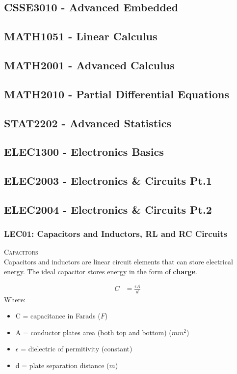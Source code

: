 \subsection{CSSE3010 - Advanced Embedded}
\clearpage

\subsection{MATH1051 - Linear Calculus}
\clearpage

\subsection{MATH2001 - Advanced Calculus}
\clearpage

\subsection{MATH2010 - Partial Differential Equations}
\clearpage

\subsection{STAT2202 - Advanced Statistics}
\clearpage

\subsection{ELEC1300 - Electronics Basics}
\clearpage

\subsection{ELEC2003 - Electronics \& Circuits Pt.1}
\clearpage

\subsection{ELEC2004 - Electronics \& Circuits Pt.2}
\subsubsection{LEC01: Capacitors and Inductors, RL and RC Circuits}
\textsc{\large Capacitors}\\
Capacitors and inductors are linear circuit elements that can store electrical energy. The ideal capacitor stores energy in the form of \textbf{charge}.

\begin{align} \label{eq_ELEC2004_capacitance}
  C &= \frac{\epsilon A}{d}
\end{align}
Where:
\begin{itemize}
  \item C = capacitance in Farads ($F$)
  \item A = conductor plates area (both top and bottom) ($mm^2$)
  \item $\epsilon$ = dielectric of permitivity (constant)
  \item d = plate separation distance ($m$)
\end{itemize}

